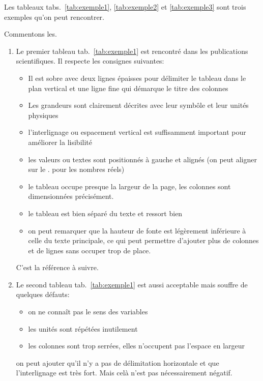Les tableaux tabs.~\ref{tab:exemple1}, \ref{tab:exemple2} et \ref{tab:exemple3} sont trois exemples qu'on peut rencontrer.

Commentons les.



\begin{enumerate}
\item Le premier tableau tab.~\ref{tab:exemple1} est rencontré dans les publications scientifiques. Il respecte les consignes suivantes:
		\begin{itemize}
		\item Il est sobre avec deux lignes épaisses pour délimiter le tableau dans le plan vertical et une ligne fine
		 qui démarque le titre des colonnes
		 \item Les grandeurs sont clairement décrites avec leur symbôle et leur unités physiques 
		 \item l'interlignage ou espacement vertical est suffisamment important pour améliorer la lisibilité
		 \item les valeurs ou textes sont positionnés à gauche et alignés (on peut aligner sur le . pour les nombres réels)
		 \item le tableau occupe presque la largeur de la page, les colonnes sont dimensionnées précisément.
		 \item le tableau est bien séparé du texte et ressort bien
		 \item on peut remarquer que la hauteur de fonte est légèrement inférieure à celle du texte principale, ce qui peut
		 permettre d'ajouter plus de colonnes et de lignes sans occuper trop de place.
		\end{itemize}
		
		C'est la référence à suivre.
		

		
\item Le second tableau tab.~\ref{tab:exemple1} est aussi acceptable mais souffre de quelques défauts:
		\begin{itemize}
		\item on ne connaît pas le sens des variables
		\item les unités sont répétées inutilement
		\item les colonnes sont trop serrées, elles n'occupent pas l'espace en largeur
		\end{itemize}	
		on peut ajouter qu'il n'y a pas de délimitation horizontale et que l'interlignage est très fort. Mais celà
		n'est pas nécessairement négatif.
		

\end{enumerate}
